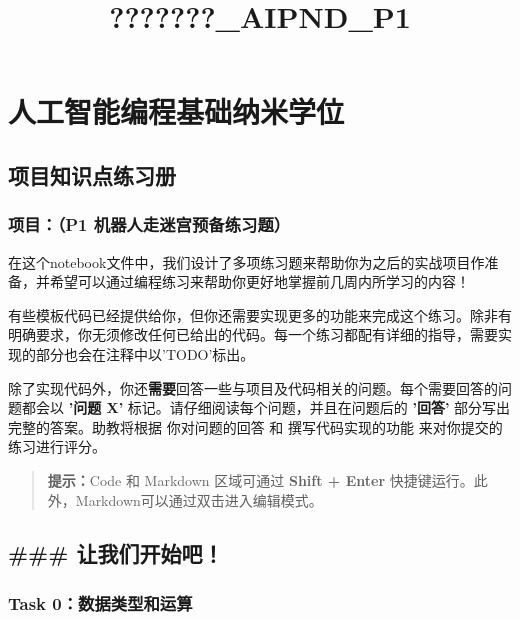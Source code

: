 \documentclass[11pt]{article}
\title{???????\_AIPND\_P1}
\begin{document}
    
    
    \maketitle
    
    

    
    \section{人工智能编程基础纳米学位}\label{ux4ebaux5de5ux667aux80fdux7f16ux7a0bux57faux7840ux7eb3ux7c73ux5b66ux4f4d}

\subsection{项目知识点练习册}\label{ux9879ux76eeux77e5ux8bc6ux70b9ux7ec3ux4e60ux518c}

\subsubsection{项目：（P1
机器人走迷宫预备练习题）}\label{ux9879ux76eep1-ux673aux5668ux4ebaux8d70ux8ff7ux5babux9884ux5907ux7ec3ux4e60ux9898}

在这个notebook文件中，我们设计了多项练习题来帮助你为之后的实战项目作准备，并希望可以通过编程练习来帮助你更好地掌握前几周内所学习的内容！
​

有些模板代码已经提供给你，但你还需要实现更多的功能来完成这个练习。除非有明确要求，你无须修改任何已给出的代码。每一个练习都配有详细的指导，需要实现的部分也会在注释中以'TODO'标出。
​

除了实现代码外，你还\textbf{需要}回答一些与项目及代码相关的问题。每个需要回答的问题都会以
\textbf{'问题 X'} 标记。请仔细阅读每个问题，并且在问题后的
\textbf{'回答'} 部分写出完整的答案。助教将根据 你对问题的回答 和
撰写代码实现的功能 来对你提交的练习进行评分。 ​

\begin{quote}
\textbf{提示：}Code 和 Markdown 区域可通过 \textbf{Shift + Enter}
快捷键运行。此外，Markdown可以通过双击进入编辑模式。
\end{quote}

\subsection{\#\#\#
让我们开始吧！}\label{ux8ba9ux6211ux4eecux5f00ux59cbux5427}

    \subsubsection{Task
0：数据类型和运算}\label{task-0ux6570ux636eux7c7bux578bux548cux8fd0ux7b97}
\end{document}
